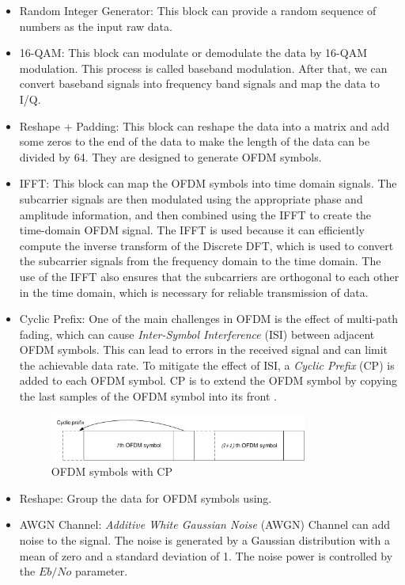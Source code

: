 \documentclass[11pt]{article}
\numberwithin{figure}{section}
\numberwithin{equation}{section}
\begin{document}
\begin{itemize}
    \item Random Integer Generator: This block can provide a random sequence of numbers as the input raw data.
    \item 16-QAM: This block can modulate or demodulate the data by 16-QAM modulation. This process is called baseband modulation. After that, we can convert baseband signals into frequency band signals and map the data to I/Q.
    \item Reshape + Padding: This block can reshape the data into a matrix and add some zeros to the end of the data to make the length of the data can be divided by 64. They are designed to generate OFDM symbols.
    \item IFFT: This block can map the OFDM symbols into time domain signals. The subcarrier signals are then modulated using the appropriate phase and amplitude information, and then combined using the IFFT to create the time-domain OFDM signal. The IFFT is used because it can efficiently compute the inverse transform of the Discrete DFT, which is used to convert the subcarrier signals from the frequency domain to the time domain. The use of the IFFT also ensures that the subcarriers are orthogonal to each other in the time domain, which is necessary for reliable transmission of data.
    \item Cyclic Prefix: One of the main challenges in OFDM is the effect of multi-path fading, which can cause \textit{Inter-Symbol Interference} (ISI) between adjacent OFDM symbols. This can lead to errors in the received signal and can limit the achievable data rate. To mitigate the effect of ISI, a \textit{Cyclic Prefix} (CP) is added to each OFDM symbol. CP is to extend the OFDM symbol by copying the last samples of the OFDM symbol into its front \cite{RN146}.
    \begin{figure}[!ht]
        \centering
        \includegraphics[width=0.8\textwidth]{images/Cyclic prefix.pdf}
        \caption{OFDM symbols with CP}
        \label{fig:CP}
    \end{figure}
    \item Reshape: Group the data for OFDM symbols using.
    \item AWGN Channel: \textit{Additive White Gaussian Noise} (AWGN) Channel can add noise to the signal. The noise is generated by a Gaussian distribution with a mean of zero and a standard deviation of 1. The noise power is controlled by the $Eb/No$ parameter.
\end{itemize}
\end{document}
